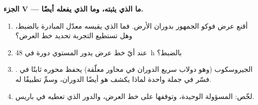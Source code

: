 \begin{problem}
\medskip
\noindent\textbf{الجزء V --- ما الذي يثبته، وما الذي يفعله أيضًا.}
\begin{enumerate}[resume]
  \item أقنع عرض فوكو الجمهور بدوران
        الأرض. فما الذي يقيسه معدّل المبادرة بالضبط، وهل
        تستطيع التجربة تحديد خط العرض؟
  \item عند أيّ خط عرض يدور المستوي دورة في \qty{48}{h} بالضبط؟
  \item الجيروسكوب (وهو دولاب سريع الدوران في محاور معلّقة) يحفظ محوره
        ثابتًا في . فسّر في جملة واحدة لماذا يكشف هو أيضًا
        الدوران، وسمِّ تطبيقًا له.
  \item لخّص:  المسؤولة الوحيدة، وتوقفها على
        خط العرض، والدور الذي تعطيه في باريس.
\end{enumerate}
\end{problem}
